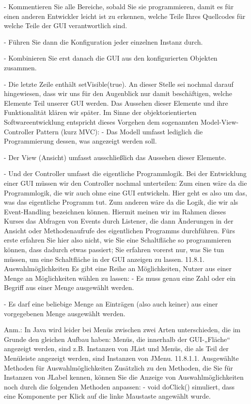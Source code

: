 -	Kommentieren Sie alle Bereiche, sobald Sie sie programmieren, damit es für einen anderen Entwickler leicht ist zu erkennen, welche Teile Ihres Quellcodes für welche Teile der GUI verantwortlich sind.

-	Führen Sie dann die Konfiguration jeder einzelnen Instanz durch.

-	Kombinieren Sie erst danach die GUI aus den konfigurierten Objekten zusammen.

-	Die letzte Zeile enthält setVisible(true).
An dieser Stelle sei nochmal darauf hingewiesen, dass wir uns für den Augenblick nur damit beschäftigen, welche Elemente Teil unserer GUI werden. Das Aussehen dieser Elemente und ihre Funktionalität klären wir später.
Im Sinne der objektorientierten Softwareentwicklung entspricht dieses Vorgehen dem sogenannten Model-View-Controller Pattern (kurz MVC): 
-	Das Modell umfasst lediglich die Programmierung dessen, was angezeigt werden soll. 

-	Der View (Ansicht) umfasst ausschließlich das Aussehen dieser Elemente.

-	Und der Controller umfasst die eigentliche Programmlogik.
Bei der Entwicklung einer GUI müssen wir den Controller nochmal unterteilen: Zum einen wäre da die Programmlogik, die wir auch ohne eine GUI entwickeln. Hier geht es also um das, was das eigentliche Programm tut. Zum anderen wäre da die Logik, die wir als Event-Handling bezeichnen können. Hiermit meinen wir im Rahmen dieses Kurses das Abfragen von Events durch Listener, die dann Änderungen in der Ansicht oder Methodenaufrufe des eigentlichen Programms durchführen.
Fürs erste erfahren Sie hier also nicht, wie Sie eine Schaltfläche so programmieren können, dass dadurch etwas passiert; Sie erfahren vorerst nur, was Sie tun müssen, um eine Schaltfläche in der GUI anzeigen zu lassen.
11.8.1.	Auswahlmöglichkeiten
Es gibt eine Reihe an Möglichkeiten, Nutzer aus einer Menge an Möglichkeiten wählen zu lassen:
-	Es muss genau eine Zahl oder ein Begriff aus einer Menge ausgewählt werden.

-	Es darf eine beliebige Menge an Einträgen (also auch keiner) aus einer vorgegebenen Menge ausgewählt werden.

Anm.: In Java wird leider bei Menüs zwischen zwei Arten unterschieden, die im Grunde den gleichen Aufbau haben: Menüs, die innerhalb der GUI-„Fläche“ angezeigt werden, sind z.B. Instanzen von JList und Menüs, die als Teil der Menüleiste angezeigt werden, sind Instanzen von JMenu.
11.8.1.1.	Ausgewählte Methoden für Auswahlmöglichkeiten
Zusätzlich zu den Methoden, die Sie für Instanzen von JLabel kennen, können Sie die Anzeige von Auswahlmöglichkeiten noch durch die folgenden Methoden anpassen:
-	void doClick() simuliert, dass eine Komponente per Klick auf die linke Maustaste angewählt wurde.

